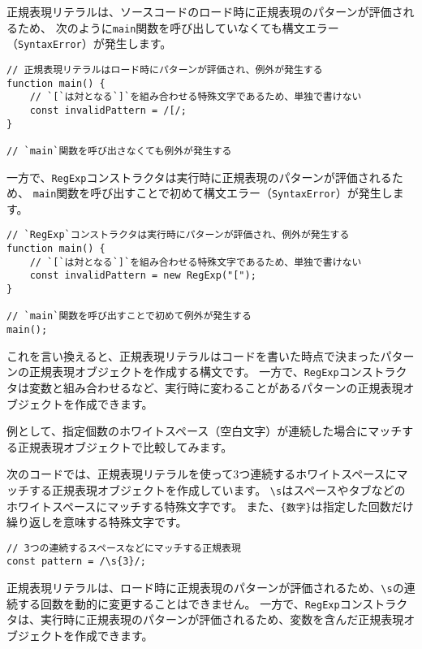 正規表現リテラルは、ソースコードのロード時に正規表現のパターンが評価されるため、
次のように\texttt{main}関数を呼び出していなくても構文エラー（\texttt{SyntaxError}）が発生します。

\begin{lstlisting}
// 正規表現リテラルはロード時にパターンが評価され、例外が発生する
function main() {
    // `[`は対となる`]`を組み合わせる特殊文字であるため、単独で書けない
    const invalidPattern = /[/;
}

// `main`関数を呼び出さなくても例外が発生する
\end{lstlisting}

一方で、\texttt{RegExp}コンストラクタは実行時に正規表現のパターンが評価されるため、
\texttt{main}関数を呼び出すことで初めて構文エラー（\texttt{SyntaxError}）が発生します。

\begin{lstlisting}
// `RegExp`コンストラクタは実行時にパターンが評価され、例外が発生する
function main() {
    // `[`は対となる`]`を組み合わせる特殊文字であるため、単独で書けない
    const invalidPattern = new RegExp("[");
}

// `main`関数を呼び出すことで初めて例外が発生する
main();
\end{lstlisting}

これを言い換えると、正規表現リテラルはコードを書いた時点で決まったパターンの正規表現オブジェクトを作成する構文です。
一方で、\texttt{RegExp}コンストラクタは変数と組み合わせるなど、実行時に変わることがあるパターンの正規表現オブジェクトを作成できます。

例として、指定個数のホワイトスペース（空白文字）が連続した場合にマッチする正規表現オブジェクトで比較してみます。

次のコードでは、正規表現リテラルを使って3つ連続するホワイトスペースにマッチする正規表現オブジェクトを作成しています。
\texttt{\textbackslash s}はスペースやタブなどのホワイトスペースにマッチする特殊文字です。
また、\texttt{\{数字\}}は指定した回数だけ繰り返しを意味する特殊文字です。

\begin{lstlisting}
// 3つの連続するスペースなどにマッチする正規表現
const pattern = /\s{3}/;
\end{lstlisting}

正規表現リテラルは、ロード時に正規表現のパターンが評価されるため、\texttt{\textbackslash s}の連続する回数を動的に変更することはできません。
一方で、\texttt{RegExp}コンストラクタは、実行時に正規表現のパターンが評価されるため、変数を含んだ正規表現オブジェクトを作成できます。

